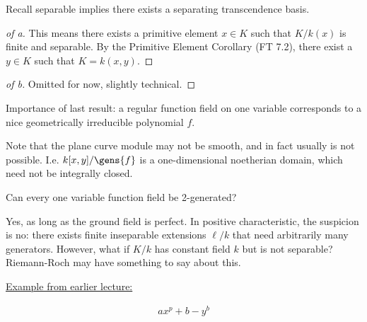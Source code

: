 Recall separable implies there exists a separating transcendence basis.

\begin{proof}[of a]

This means there exists a primitive element \(x\in K\) such that
\(K/k(x)\) is finite and separable. By the Primitive Element Corollary
(FT 7.2), there exist a \(y\in K\) such that \(K = k(x, y)\).

\end{proof}

\begin{proof}[of b]

Omitted for now, slightly technical.

\end{proof}

\begin{remark}

Importance of last result: a regular function field on one variable
corresponds to a nice geometrically irreducible polynomial \(f\).

\end{remark}

\begin{remark}

Note that the plane curve module may not be smooth, and in fact usually
is not possible. I.e. \(k[x ,y]/\gens{f}\) is a one-dimensional
noetherian domain, which need not be integrally closed.

\end{remark}

\begin{question}

Can every one variable function field be 2-generated?

\end{question}

\begin{answer}

Yes, as long as the ground field is perfect. In positive characteristic,
the suspicion is no: there exists finite inseparable extensions
\(\ell/k\) that need arbitrarily many generators. However, what if
\(K/k\) has constant field \(k\) but is not separable? Riemann-Roch may
have something to say about this.

\end{answer}

\begin{example}

\hyperref[technical_example]{Example from earlier lecture:}

\begin{align*}
ax^p + b - y^b
\end{align*}

\end{example}

